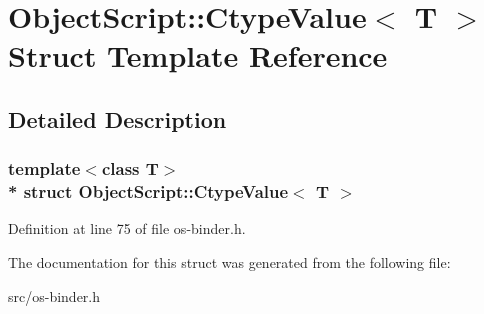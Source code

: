\hypertarget{struct_object_script_1_1_ctype_value}{}\section{Object\+Script\+:\+:Ctype\+Value$<$ T $>$ Struct Template Reference}
\label{struct_object_script_1_1_ctype_value}


\subsection{Detailed Description}
\subsubsection*{template$<$class T$>$\\*
struct Object\+Script\+::\+Ctype\+Value$<$ T $>$}



Definition at line 75 of file os-\/binder.\+h.



The documentation for this struct was generated from the following file\+:\begin{DoxyCompactItemize}
\item 
src/os-\/binder.\+h\end{DoxyCompactItemize}

